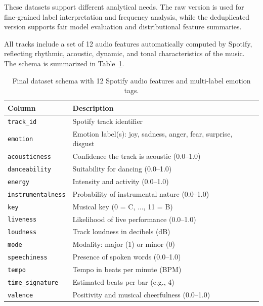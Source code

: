\documentclass{article}
\begin{document}
These datasets support different analytical needs. The raw version is used for fine-grained label interpretation and frequency analysis, while the deduplicated version supports fair model evaluation and distributional feature summaries.

All tracks include a set of 12 audio features automatically computed by Spotify, reflecting rhythmic, acoustic, dynamic, and tonal characteristics of the music. The schema is summarized in Table~\ref{tab:final-dataset-schema}.

\begin{table}[H]
\centering
\begin{tabular}{|l|l|}
\hline
\textbf{Column} & \textbf{Description} \\
\hline
\texttt{track\_id} & Spotify track identifier \\
\texttt{emotion} & Emotion label(s): joy, sadness, anger, fear, surprise, disgust \\
\texttt{acousticness} & Confidence the track is acoustic (0.0–1.0) \\
\texttt{danceability} & Suitability for dancing (0.0–1.0) \\
\texttt{energy} & Intensity and activity (0.0–1.0) \\
\texttt{instrumentalness} & Probability of instrumental nature (0.0–1.0) \\
\texttt{key} & Musical key (0 = C, ..., 11 = B) \\
\texttt{liveness} & Likelihood of live performance (0.0–1.0) \\
\texttt{loudness} & Track loudness in decibels (dB) \\
\texttt{mode} & Modality: major (1) or minor (0) \\
\texttt{speechiness} & Presence of spoken words (0.0–1.0) \\
\texttt{tempo} & Tempo in beats per minute (BPM) \\
\texttt{time\_signature} & Estimated beats per bar (e.g., 4) \\
\texttt{valence} & Positivity and musical cheerfulness (0.0–1.0) \\
\hline
\end{tabular}
\caption{Final dataset schema with 12 Spotify audio features and multi-label emotion tags.}
\label{tab:final-dataset-schema}
\end{table}
\end{document}
